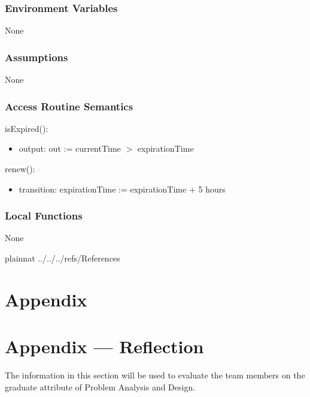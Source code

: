 \documentclass[12pt, titlepage]{article}
\begin{document}
\subsubsection{Environment Variables}
None

\subsubsection{Assumptions}
None

\subsubsection{Access Routine Semantics}

\noindent isExpired():
\begin{itemize}
\item output: out := currentTime $>$ expirationTime
\end{itemize}

\noindent renew():
\begin{itemize}
\item transition: expirationTime := expirationTime + 5 hours
\end{itemize}

\subsubsection{Local Functions}
None

\newpage

 {plainnat}
 {../../../refs/References}

\newpage

\section{Appendix} \label{Appendix}


\newpage{}

\section*{Appendix --- Reflection}


The information in this section will be used to evaluate the team members on the
graduate attribute of Problem Analysis and Design.


\end{document}
